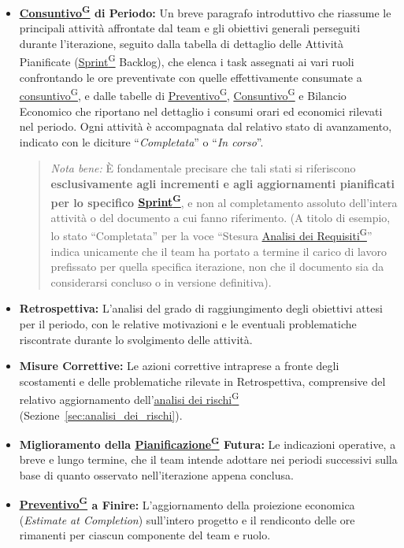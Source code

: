 \documentclass[a4paper,12pt]{article}
\providecommand{\glslink}[2]{\href{https://alittlebyte-19.github.io/Documentazione/glossario.html\#gls-#1}{\underline{#2}\textsuperscript{\scriptsize G}}}
\begin{document}
\begin{itemize}
    \item \textbf{\glslink{consuntivo}{Consuntivo} di Periodo:} Un breve paragrafo introduttivo che riassume le principali attività affrontate dal team e gli obiettivi generali perseguiti durante l'iterazione, seguito dalla tabella di dettaglio delle Attività Pianificate (\glslink{sprint}{Sprint} Backlog), che elenca i task assegnati ai vari ruoli confrontando le ore preventivate con quelle effettivamente consumate a \glslink{consuntivo}{consuntivo}, e dalle tabelle di \glslink{preventivo}{Preventivo}, \glslink{consuntivo}{Consuntivo} e Bilancio Economico che riportano nel dettaglio i consumi orari ed economici rilevati nel periodo. Ogni attività è accompagnata dal relativo stato di avanzamento, indicato con le diciture ``\textit{Completata}'' o ``\textit{In corso}''.
    \begin{quote}
        \textit{Nota bene:} È fondamentale precisare che tali stati si riferiscono \textbf{esclusivamente agli incrementi e agli aggiornamenti pianificati per lo specifico \glslink{sprint}{Sprint}}, e non al completamento assoluto dell'intera attività o del documento a cui fanno riferimento. (A titolo di esempio, lo stato ``Completata'' per la voce ``Stesura \glslink{analisi-dei-requisiti-adr}{Analisi dei Requisiti}'' indica unicamente che il team ha portato a termine il carico di lavoro prefissato per quella specifica iterazione, non che il documento sia da considerarsi concluso o in versione definitiva).
    \end{quote}

    \item \textbf{Retrospettiva:} L'analisi del grado di raggiungimento degli obiettivi attesi per il periodo, con le relative motivazioni e le eventuali problematiche riscontrate durante lo svolgimento delle attività.

    \item \textbf{Misure Correttive:} Le azioni correttive intraprese a fronte degli scostamenti e delle problematiche rilevate in Retrospettiva, comprensive del relativo aggiornamento dell'\glslink{analisi-dei-rischi}{analisi dei rischi} (Sezione~\ref{sec:analisi_dei_rischi}).

    \item \textbf{Miglioramento della \glslink{pianificazione}{Pianificazione} Futura:} Le indicazioni operative, a breve e lungo termine, che il team intende adottare nei periodi successivi sulla base di quanto osservato nell'iterazione appena conclusa.

    \item \textbf{\glslink{preventivo}{Preventivo} a Finire:} L'aggiornamento della proiezione economica (\textit{Estimate at Completion}) sull'intero progetto e il rendiconto delle ore rimanenti per ciascun componente del team e ruolo.
\end{itemize}
\end{document}
